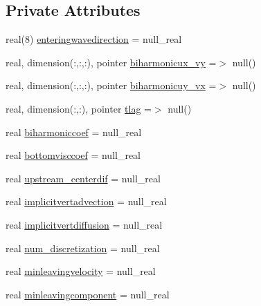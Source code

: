\subsection*{Private Attributes}
\begin{DoxyCompactItemize}
\item 
real(8) \mbox{\hyperlink{structmodulehydrodynamic_1_1t__hydrooptions_a9f14c62542ede73cad356c09c0c6bdbf}{enteringwavedirection}} = null\+\_\+real
\item 
real, dimension(\+:,\+:,\+:), pointer \mbox{\hyperlink{structmodulehydrodynamic_1_1t__hydrooptions_a1aa76a484bee23a64631a44a2b87b492}{biharmonicux\+\_\+vy}} =$>$ null()
\item 
real, dimension(\+:,\+:,\+:), pointer \mbox{\hyperlink{structmodulehydrodynamic_1_1t__hydrooptions_afa035dfcd012f82a2a130fc72c73db90}{biharmonicuy\+\_\+vx}} =$>$ null()
\item 
real, dimension(\+:,\+:), pointer \mbox{\hyperlink{structmodulehydrodynamic_1_1t__hydrooptions_adc577df6212a001217ca28f921bd38b4}{tlag}} =$>$ null()
\item 
real \mbox{\hyperlink{structmodulehydrodynamic_1_1t__hydrooptions_a346ec297a118aa45562390c8a4493343}{biharmoniccoef}} = null\+\_\+real
\item 
real \mbox{\hyperlink{structmodulehydrodynamic_1_1t__hydrooptions_a69523db626ef84cf56808f788068e722}{bottomvisccoef}} = null\+\_\+real
\item 
real \mbox{\hyperlink{structmodulehydrodynamic_1_1t__hydrooptions_a9eb86c34b6cd3cecac53228ac1b6ece8}{upstream\+\_\+centerdif}} = null\+\_\+real
\item 
real \mbox{\hyperlink{structmodulehydrodynamic_1_1t__hydrooptions_a94c1c8cdeb6277eff233dc17fc78ad2a}{implicitvertadvection}} = null\+\_\+real
\item 
real \mbox{\hyperlink{structmodulehydrodynamic_1_1t__hydrooptions_afa02ae54764ecd023aea1b4df836ffcb}{implicitvertdiffusion}} = null\+\_\+real
\item 
real \mbox{\hyperlink{structmodulehydrodynamic_1_1t__hydrooptions_a78b301682e8c834aed66fd9942a0d3d9}{num\+\_\+discretization}} = null\+\_\+real
\item 
real \mbox{\hyperlink{structmodulehydrodynamic_1_1t__hydrooptions_a11ce3bff083780c6967d89da0374a474}{minleavingvelocity}} = null\+\_\+real
\item 
real \mbox{\hyperlink{structmodulehydrodynamic_1_1t__hydrooptions_a892fdac14a4406adebf1ed4a9e881342}{minleavingcomponent}} = null\+\_\+real
\item 

\end{DoxyCompactItemize}
